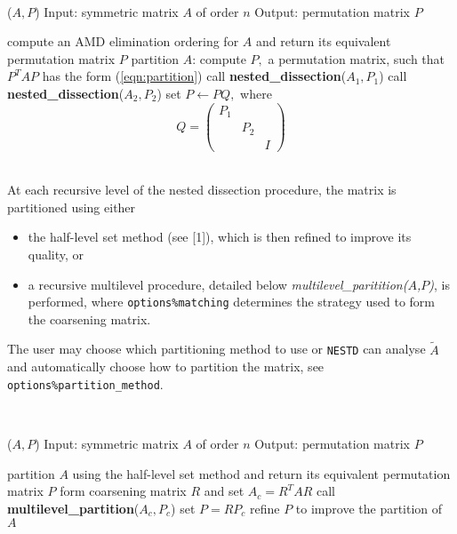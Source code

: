 \noindent\hrulefill\\
\vspace{-1.0em}
\begin{algorithmic}
($A,P$)
\STATE Input: symmetric matrix $A$ of order $n$
\STATE Output: permutation matrix $P$

\STATE compute an AMD elimination ordering for $A$ and return its equivalent 
permutation matrix $P$ 
\ELSE
\STATE partition $A$: compute $P,$ a permutation matrix, such that $P^T A P$ 
has the form (\ref{eqn:partition})
\STATE call {\bf nested\_dissection}($A_1,P_1$)
\STATE call {\bf nested\_dissection}($A_2,P_2$)
\STATE set $P \leftarrow PQ,$ where $$Q = \left( \begin{array}{ccc} P_1 & & \\ & P_2 & \\ & & I  \end{array} \right)$$
\ENDIF

\end{algorithmic}
\noindent\hrulefill\\

At each recursive level of the nested dissection procedure, the matrix is 
partitioned using either 
\begin{itemize}
\item the half-level set method (see [1]), which is then refined to improve its 
quality, or 
\item a recursive multilevel procedure, detailed below \textit{multilevel\_paritition($A$,$P$)}, 
is performed, where \texttt{options\%matching} determines the strategy used to form 
the coarsening matrix.
\end{itemize}
The user may choose which partitioning method to use or {\tt NESTD} can analyse 
$\widetilde{A}$ and automatically choose how to partition the matrix, see 
\texttt{options\%partition\_method}.

\vspace{0.5cm}
\noindent\hrulefill\\
\vspace{-1.0em}
\begin{algorithmic}
($A,P$)
\STATE Input: symmetric matrix $A$ of order $n$
\STATE Output: permutation matrix $P$

\STATE partition $A$ using the half-level set method and return its equivalent permutation matrix $P$ 
\ELSE
\STATE form coarsening matrix $R$ and set $A_c = R^T A R$
\STATE call {\bf multilevel\_partition}($A_c,P_c$)
\STATE set $P = RP_c$
\STATE refine $P$ to improve the partition of $A$
\ENDIF

\end{algorithmic}
\noindent\hrulefill


